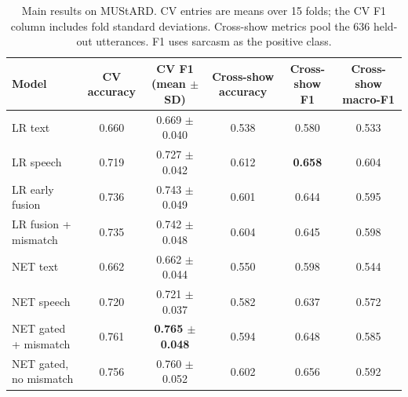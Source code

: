 \begin{table}[t]
\caption{Main results on MUStARD. CV entries are means over 15 folds; the CV F1 column includes fold standard deviations. Cross-show metrics pool the 636 held-out utterances. F1 uses sarcasm as the positive class.}
\label{tab:main}
\centering
\begin{tabular}{lccccc}
\hline
Model & CV accuracy & CV F1 (mean $\pm$ SD) & Cross-show accuracy & Cross-show F1 & Cross-show macro-F1 \\
\hline
LR text & 0.660 & 0.669 $\pm$ 0.040 & 0.538 & 0.580 & 0.533 \\
LR speech & 0.719 & 0.727 $\pm$ 0.042 & 0.612 & \textbf{0.658} & 0.604 \\
LR early fusion & 0.736 & 0.743 $\pm$ 0.049 & 0.601 & 0.644 & 0.595 \\
LR fusion + mismatch & 0.735 & 0.742 $\pm$ 0.048 & 0.604 & 0.645 & 0.598 \\
NET text & 0.662 & 0.662 $\pm$ 0.044 & 0.550 & 0.598 & 0.544 \\
NET speech & 0.720 & 0.721 $\pm$ 0.037 & 0.582 & 0.637 & 0.572 \\
NET gated + mismatch & 0.761 & \textbf{0.765 $\pm$ 0.048} & 0.594 & 0.648 & 0.585 \\
NET gated, no mismatch & 0.756 & 0.760 $\pm$ 0.052 & 0.602 & 0.656 & 0.592 \\
\hline
\end{tabular}
\end{table}
